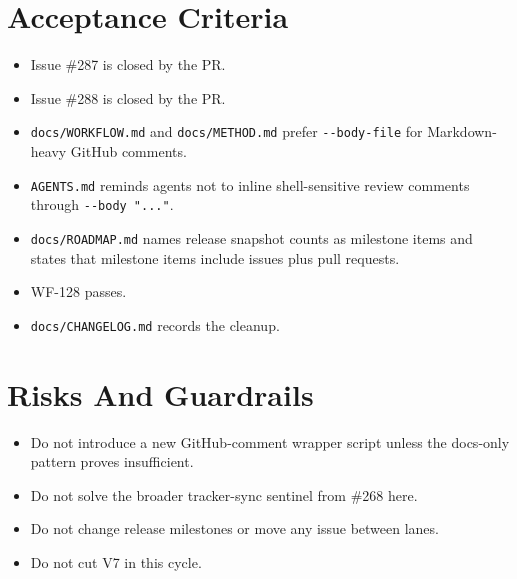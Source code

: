 \section{Acceptance Criteria}\label{record-210-acceptance-criteria}

\begin{itemize}
\tightlist
\item
  Issue \#287 is closed by the PR.
\item
  Issue \#288 is closed by the PR.
\item
  \texttt{d\allowbreak{}o\allowbreak{}c\allowbreak{}s\allowbreak{}/\allowbreak{}W\allowbreak{}O\allowbreak{}R\allowbreak{}K\allowbreak{}F\allowbreak{}L\allowbreak{}O\allowbreak{}W\allowbreak{}.\allowbreak{}m\allowbreak{}d} and \texttt{d\allowbreak{}o\allowbreak{}c\allowbreak{}s\allowbreak{}/\allowbreak{}M\allowbreak{}E\allowbreak{}T\allowbreak{}H\allowbreak{}O\allowbreak{}D\allowbreak{}.\allowbreak{}m\allowbreak{}d} prefer \texttt{-\allowbreak{}-\allowbreak{}b\allowbreak{}o\allowbreak{}d\allowbreak{}y\allowbreak{}-\allowbreak{}f\allowbreak{}i\allowbreak{}l\allowbreak{}e} for Markdown-heavy GitHub comments.
\item
  \texttt{A\allowbreak{}G\allowbreak{}E\allowbreak{}N\allowbreak{}T\allowbreak{}S\allowbreak{}.\allowbreak{}m\allowbreak{}d} reminds agents not to inline shell-sensitive review comments through \texttt{-\allowbreak{}-\allowbreak{}b\allowbreak{}o\allowbreak{}d\allowbreak{}y\allowbreak{} \allowbreak{}"\allowbreak{}.\allowbreak{}.\allowbreak{}.\allowbreak{}"}.
\item
  \texttt{d\allowbreak{}o\allowbreak{}c\allowbreak{}s\allowbreak{}/\allowbreak{}R\allowbreak{}O\allowbreak{}A\allowbreak{}D\allowbreak{}M\allowbreak{}A\allowbreak{}P\allowbreak{}.\allowbreak{}m\allowbreak{}d} names release snapshot counts as milestone items and states that milestone items include issues plus pull requests.
\item
  WF-128 passes.
\item
  \texttt{d\allowbreak{}o\allowbreak{}c\allowbreak{}s\allowbreak{}/\allowbreak{}C\allowbreak{}H\allowbreak{}A\allowbreak{}N\allowbreak{}G\allowbreak{}E\allowbreak{}L\allowbreak{}O\allowbreak{}G\allowbreak{}.\allowbreak{}m\allowbreak{}d} records the cleanup.
\end{itemize}

\section{Risks And Guardrails}\label{record-210-risks-and-guardrails}

\begin{itemize}
\tightlist
\item
  Do not introduce a new GitHub-comment wrapper script unless the docs-only pattern proves insufficient.
\item
  Do not solve the broader tracker-sync sentinel from \#268 here.
\item
  Do not change release milestones or move any issue between lanes.
\item
  Do not cut V7 in this cycle.
\end{itemize}

